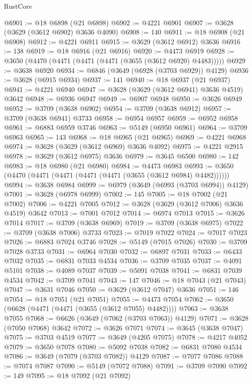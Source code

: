 \begin{lexlean}{RustCore}
\begin{coremodule}
@6901 := @18 @6898 (@21 @6898)
@6902 := @4221 @6901
@6907 := @3628 (@3629 (@3612 @6902) @3636 @4090)
@6908 := 140
@6911 := @18 @6908 (@21 @6908)
@6912 := @4221 @6911
@6915 := @3629 (@3612 @6912) @3636
@6916 := 138
@6919 := @18 @6916 (@21 @6916)
@6920 := @4473 @6919
@6928 := @3650 (@4470 (@4471 (@4471 (@4471 (@3655 (@3612 @6920) @4483)))))
@6929 := @3638 @6920
@6934 := @6846 (@3649 (@6928 (@3703 @6929)) @4129)
@6936 := @3628 (@6915 @6934)
@6937 := 141
@6940 := @18 @6937 (@21 @6937)
@6941 := @4221 @6940
@6947 := @3628 (@3629 (@3612 @6941) @3636 @4519) @3642
@6948 := @6936 @6947
@6949 := @6907 @6948
@6950 := @3626 @6949
@6952 := @3709 (@3638 @6902)
@6954 := @3709 (@3638 @6912)
@6957 := @3709 (@3638 @6941) @3733
@6958 := @6954 @6957
@6959 := @6952 @6958
@6961 := @6883 @6959 @3746
@6963 := @5149 (@6950 @6961)
@6964 := @3709 @6963
@6965 := 143
@6968 := @18 @6965 (@21 @6965)
@6969 := @4221 @6968
@6974 := @3628 (@3629 (@3612 @6969) @3636 @4092)
@6975 := @4221 @2915
@6978 := @3629 (@3612 @6975) @3636
@6979 := @3645 @6500
@6980 := 142
@6983 := @18 @6980 (@21 @6980)
@6984 := @4473 @6983
@6993 := @3650 (@4470 (@4471 (@4471 (@4471 (@4471 (@3655 (@3612 @6984) @4482))))))
@6994 := @3638 @6984
@6999 := @6979 (@3649 (@6993 (@3703 @6994)) @4129)
@7001 := @3628 (@6978 @6999)
@7002 := 145
@7005 := @18 @7002 (@21 @7002)
@7006 := @4221 @7005
@7012 := @3628 (@3629 (@3612 @7006) @3636 @4519) @3642
@7013 := @7001 @7012
@7014 := @6974 @7013
@7015 := @3626 @7014
@7017 := @3709 (@3638 @6969)
@7019 := @3709 (@3638 @6975)
@7022 := @3709 (@3638 @7006) @3733
@7023 := @7019 @7022
@7024 := @7017 @7023
@7026 := @6883 @7024 @3746
@7028 := @5149 (@7015 @7026)
@7030 := @3709 @7028 @3733
@7031 := @6964 @7030
@7032 := @6897 @7031
@7033 := @6433 @7032
@7035 := @6831 @7033 @4534
@7036 := @3709 @7035
@7037 := @4091 @5101
@7038 := @4089 @7037
@7039 := @5091 @7038
@7041 := @6831 @7039 @4534
@7042 := @3709 @7041
@7043 := 147
@7046 := @18 @7043 (@21 @7043)
@7047 := @3631 @7046
@7050 := @3629 (@3612 @7047) @3636
@7051 := 146
@7054 := @18 @7051 (@21 @7051)
@7055 := @4473 @7054
@7062 := @3650 (@6628 (@4471 (@4471 (@3655 (@3612 @7055) @4482))))
@7063 := @3638 @7055
@7068 := @6626 (@3649 (@7062 (@3703 @7063)) @4129)
@7071 := @3628 (@7050 @7068) @3642
@7072 := @3626 @7071
@7074 := @3645 (@3638 @7047)
@7075 := @3703 @4519
@7077 := @3649 (@4205 @7075)
@7078 := @4217 @4052
@7079 := @3650 @7078
@7080 := @5092 @7038
@7082 := @6831 @7080 @4534
@7086 := @3649 (@7079 (@3703 @7082)) @4129
@7087 := @7077 @7086
@7088 := @7074 @7087
@7090 := @5149 (@7072 @7088)
@7091 := @3709 @7090
@7092 := 149
@7095 := @18 @7092 (@21 @7092)

\end{coremodule}
\end{lexlean}

